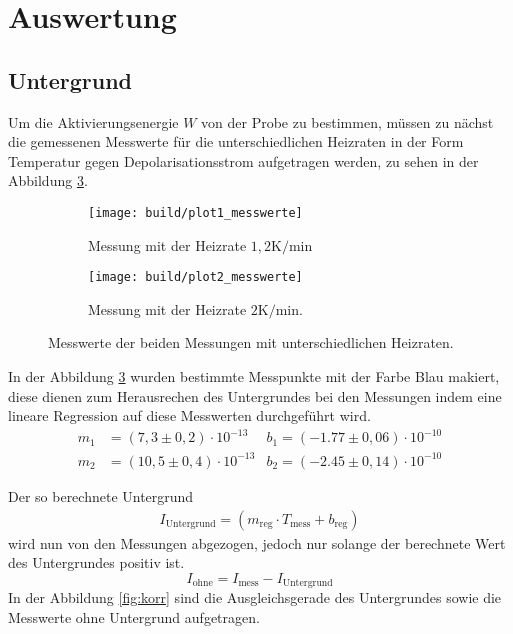 \section{Auswertung}
\label{sec:Auswertung}

\subsection{Untergrund}
\label{sec:Untergrund}

Um die Aktivierungsenergie $W$ von der Probe zu bestimmen,
müssen zu nächst die gemessenen
Messwerte für die unterschiedlichen Heizraten in der Form
Temperatur gegen Depolarisationsstrom aufgetragen werden, zu sehen
in der Abbildung \ref{fig:mess}.

\begin{figure}
  \centering
  \begin{subfigure}{0.48\textwidth}
    \centering
    \texttt{[image: build/plot1\_messwerte]}
    \caption{Messung mit der Heizrate $1,2 \si{\kelvin\per\minute}$}
    \label{fig:mess1}
  \end{subfigure}
  \begin{subfigure}{0.48\textwidth}
    \centering
    \texttt{[image: build/plot2\_messwerte]}
    \caption{Messung mit der Heizrate $2 \si{\kelvin\per\minute}$.}
    \label{fig:mess2}
  \end{subfigure}
\caption{Messwerte der beiden Messungen mit unterschiedlichen Heizraten.}
\label{fig:mess}
\end{figure}


In der Abbildung \ref{fig:mess} wurden bestimmte
Messpunkte mit der Farbe Blau
makiert, diese dienen zum Herausrechen des Untergrundes
bei den Messungen indem eine lineare Regression auf diese Messwerten
durchgeführt wird.
\begin{align*}
m_1&= (7,3\pm0,2)\cdot10^{-13}      &b_1 =(-1.77\pm0,06)\cdot10^{-10} \\
m_2&=(10,5\pm0,4)\cdot10^{-13}      &b_2 =(-2.45\pm0,14)\cdot10^{-10}
\end{align*}

Der so berechnete Untergrund
\begin{align*}
  I_\mathrm{Untergrund}=(m_\mathrm{reg}\cdot T_\mathrm{mess}+b_\mathrm{reg})
\end{align*}
wird nun von den Messungen
abgezogen, jedoch nur solange der berechnete Wert
des Untergrundes positiv ist.
\begin{equation}
 I_{\mathrm{ohne}}=I_{\mathrm{mess}}-I_\mathrm{Untergrund}\label{eqn:Untergrund}
\end{equation}
In der Abbildung \ref{fig:korr} sind die Ausgleichsgerade des Untergrundes
sowie die Messwerte ohne Untergrund aufgetragen.

